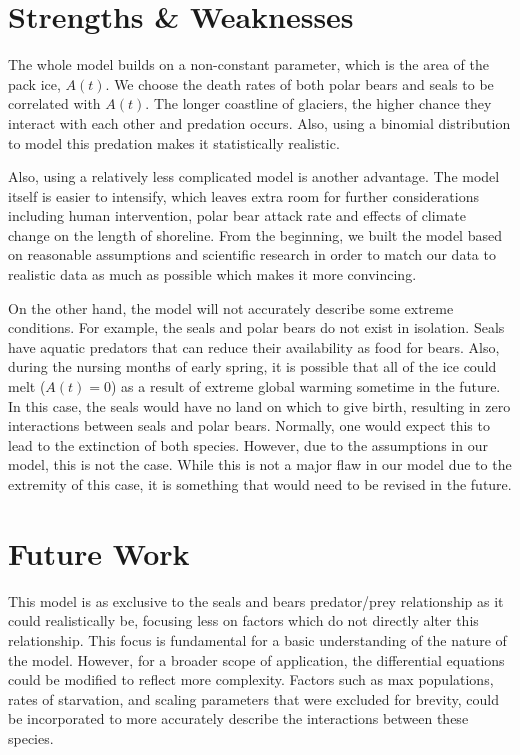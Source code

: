 \documentclass[reqno,11pt]{amsart}
\begin{document}
\section{Strengths \& Weaknesses}
\label{sec:strengths}
The whole model builds on a non-constant parameter, which is the area of the pack ice, $A(t)$. We choose the death rates of both polar bears and seals to be correlated with $A(t)$. The longer coastline of glaciers, the higher chance they interact with each other and predation occurs. Also, using a binomial distribution to model this predation makes it statistically realistic.

Also, using a relatively less complicated model is another advantage. The model itself is easier to intensify, which leaves extra room for further considerations including human intervention, polar bear attack rate and effects of climate change on the length of shoreline. From the beginning, we built the model based on reasonable assumptions and scientific research in order to match our data to realistic data as much as possible which makes it more convincing.

On the other hand, the model will not accurately describe some extreme conditions. For example, the seals and polar bears do not exist in isolation. Seals have aquatic predators that can reduce their availability as food for bears. Also, during the nursing months of early spring, it is possible that all of the ice could melt ($A(t)=0$) as a result of extreme global warming sometime in the future. In this case, the seals would have no land on which to give birth, resulting in zero interactions between seals and polar bears. Normally, one would expect this to lead to the extinction of both species. However, due to the assumptions in our model, this is not the case. While this is not a major flaw in our model due to the extremity of this case, it is something that would need to be revised in the future.

\section{Future Work}
\label{sec:future}
This model is as exclusive to the seals and bears predator/prey relationship as it could realistically be, focusing less on factors which do not directly alter this relationship. This focus is fundamental for a basic understanding of the nature of the model. However, for a broader scope of application, the differential equations could be modified to reflect more complexity. Factors such as max populations, rates of starvation, and scaling parameters that were excluded for brevity, could be incorporated to more accurately describe the interactions between these species.
\end{document}
